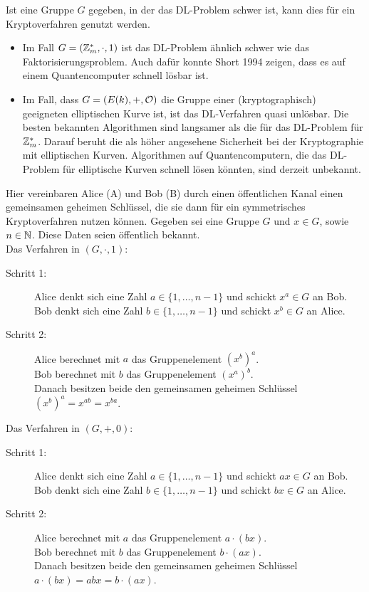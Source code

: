 \begin{bem}
	Ist eine Gruppe $G$ gegeben, in der das DL-Problem schwer ist, kann dies für ein Kryptoverfahren genutzt werden.\begin{itemize}
		\item Im Fall $G = (\mathbb{Z}_m^*,\cdot,1)$ ist das DL-Problem ähnlich schwer wie das Faktorisierungsproblem. Auch dafür konnte Short 1994 zeigen, dass es auf einem Quantencomputer schnell lösbar ist.
		\item Im Fall, dass $G = (E(k),+,\mathcal{O})$ die Gruppe einer (kryptographisch) geeigneten elliptischen Kurve ist, ist das DL-Verfahren quasi unlösbar. Die besten bekannten Algorithmen sind langsamer als die für das DL-Problem für $\mathbb{Z}_m^*$. Darauf beruht die als höher angesehene Sicherheit bei der Kryptographie mit elliptischen Kurven. Algorithmen auf Quantencomputern, die das DL-Problem für elliptische Kurven schnell lösen könnten, sind derzeit unbekannt.
	\end{itemize}
\end{bem}

\begin{anw}
	Hier vereinbaren Alice (A) und Bob (B) durch einen öffentlichen Kanal einen gemeinsamen geheimen Schlüssel, die sie dann für ein symmetrisches Kryptoverfahren nutzen können. Gegeben sei eine Gruppe $G$ und $x \in G$, sowie $n \in \mathbb{N}$. Diese Daten seien öffentlich bekannt. \\
	Das Verfahren in $(G,\cdot,1)$:
	\begin{description}
		\item[Schritt 1:] Alice denkt sich eine Zahl $a \in \{1,\dots,n-1\}$ und schickt $x^a \in G$ an Bob.\\
		Bob denkt sich eine Zahl $b \in \{1,\dots,n-1\}$ und schickt $x^b \in G$ an Alice.
		\item[Schritt 2:] Alice berechnet mit $a$ das Gruppenelement $(x^b)^a$. \\
		Bob berechnet mit $b$ das Gruppenelement $(x^a)^b$. \\
		Danach besitzen beide den gemeinsamen geheimen Schlüssel $(x^b)^a = x^{ab} = x^{ba}$.
	\end{description}
	Das Verfahren in $(G,+,0)$:
	\begin{description}
		\item[Schritt 1:] Alice denkt sich eine Zahl $a \in \{1,\dots,n-1\}$ und schickt $ax \in G$ an Bob.\\
		Bob denkt sich eine Zahl $b \in \{1,\dots,n-1\}$ und schickt $bx \in G$ an Alice.
		\item[Schritt 2:] Alice berechnet mit $a$ das Gruppenelement $a\cdot(bx)$. \\
		Bob berechnet mit $b$ das Gruppenelement $b\cdot(ax)$. \\
		Danach besitzen beide den gemeinsamen geheimen Schlüssel $a\cdot(bx) = abx = b\cdot(ax)$.
	\end{description}
\end{anw}

